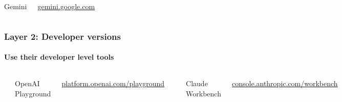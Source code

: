 \documentclass[aspectratio=169]{beamer}
\begin{document}
\begin{frame}
\begin{columns}
        Gemini
        
        \url{gemini.google.com}
    \end{columns}
\end{frame}

\begin{frame}
    \frametitle{Layer 2: Developer versions}
    \framesubtitle{Use their developer level tools}
    
    \begin{columns}
        \centering
        \includegraphics[width=\textwidth]{figures/chatgpt_dev_screenshot.png}
        
        OpenAI Playground
        
        \url{platform.openai.com/playground}
        
        \centering
        \includegraphics[width=\textwidth]{figures/claude_dev_screenshot.png}
        
        Claude Workbench
        
        \url{console.anthropic.com/workbench}
        

\end{columns}
\end{frame}
\end{document}

